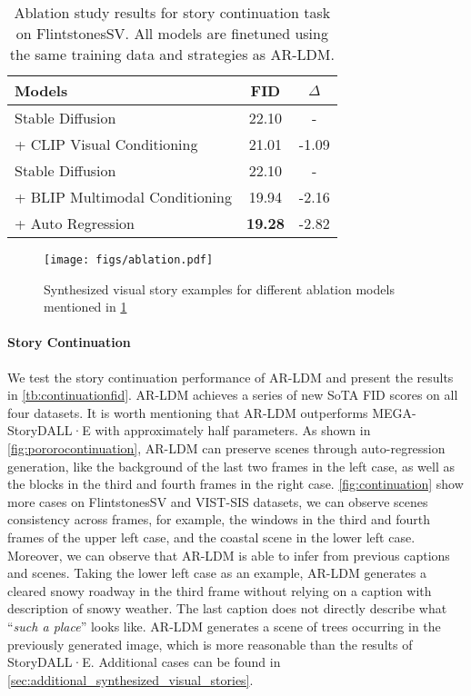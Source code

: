 \documentclass[10pt,twocolumn,letterpaper]{article}
\begin{document}
\begin{table}[!t]
\small
\centering
\setlength\tabcolsep{11pt}
\begin{tabularx}{\linewidth}{lcc}
    \toprule
    Models & FID & $\Delta$\\
    \midrule
    Stable Diffusion~\cite{ldm} & 22.10 & - \\
    \quad + CLIP Visual Conditioning & 21.01 & -1.09\\
    \midrule
    Stable Diffusion~\cite{ldm} & 22.10 & - \\
    \quad + BLIP Multimodal Conditioning & 19.94 & -2.16 \\
    \quad \quad + Auto Regression & \textbf{19.28} & -2.82 \\
    \bottomrule
    \end{tabularx}
\caption{Ablation study results for story continuation task on FlintstonesSV. All models are finetuned using the same training data and strategies as AR-LDM.}
\label{tb:ablation}
\end{table}

\begin{figure}[!t]
    \centering
    \texttt{[image: figs/ablation.pdf]}
    \caption{Synthesized visual story examples for different ablation models mentioned in \cref{tb:ablation}}
    \label{fig:ablation}
\end{figure}

\paragraph{Story Continuation}
We test the story continuation performance of AR-LDM and present the results in \cref{tb:continuationfid}. AR-LDM achieves a series of new SoTA FID scores on all four datasets.
It is worth mentioning that AR-LDM outperforms MEGA-StoryDALL·E with approximately half parameters. As shown in \cref{fig:pororocontinuation}, AR-LDM can preserve scenes through auto-regression generation, like the background of the last two frames in the left case, as well as the blocks in the third and fourth frames in the right case. \cref{fig:continuation} show more cases on FlintstonesSV and VIST-SIS datasets, we can observe scenes consistency across frames, for example, the windows in the third and fourth frames of the upper left case, and the coastal scene in the lower left case. Moreover, we can observe that AR-LDM is able to infer from previous captions and scenes. Taking the lower left case as an example, AR-LDM generates a cleared snowy roadway in the third frame without relying on a caption with description of snowy weather. The last caption does not directly describe what ``\textit{such a place}'' looks like. 
AR-LDM generates a scene of trees occurring in the previously generated image, which is more reasonable than the results of StoryDALL·E. Additional cases can be found in \cref{sec:additional_synthesized_visual_stories}.
\end{document}
